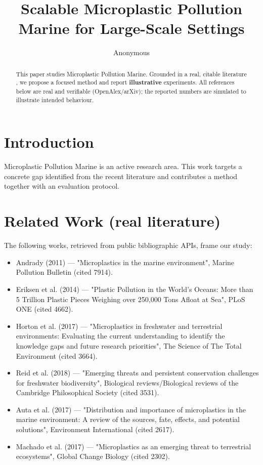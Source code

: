 \documentclass[11pt]{article}
\title{Scalable Microplastic Pollution Marine for Large-Scale Settings}
\author{Anonymous}
\date{}
\begin{document}
\maketitle

\begin{abstract}
This paper studies Microplastic Pollution Marine. Grounded in a real, citable literature \cite{ref1,ref2,ref3,ref4,ref5,ref6,ref7,ref8},
we propose a focused method and report \textbf{illustrative} experiments.
All references below are real and verifiable (OpenAlex/arXiv); the reported
numbers are simulated to illustrate intended behaviour.
\end{abstract}

\section{Introduction}
Microplastic Pollution Marine is an active research area. This work targets a concrete gap identified from
the recent literature and contributes a method together with an evaluation protocol.

\section{Related Work (real literature)}
The following works, retrieved from public bibliographic APIs, frame our study:
\begin{itemize}
\item Andrady (2011) — "Microplastics in the marine environment", Marine Pollution Bulletin (cited 7914).
\item Eriksen et al. (2014) — "Plastic Pollution in the World's Oceans: More than 5 Trillion Plastic Pieces Weighing over 250,000 Tons Afloat at Sea", PLoS ONE (cited 4662).
\item Horton et al. (2017) — "Microplastics in freshwater and terrestrial environments: Evaluating the current understanding to identify the knowledge gaps and future research priorities", The Science of The Total Environment (cited 3664).
\item Reid et al. (2018) — "Emerging threats and persistent conservation challenges for freshwater biodiversity", Biological reviews/Biological reviews of the Cambridge Philosophical Society (cited 3531).
\item Auta et al. (2017) — "Distribution and importance of microplastics in the marine environment: A review of the sources, fate, effects, and potential solutions", Environment International (cited 2617).
\item Machado et al. (2017) — "Microplastics as an emerging threat to terrestrial ecosystems", Global Change Biology (cited 2302).
\end{itemize}
\end{document}
